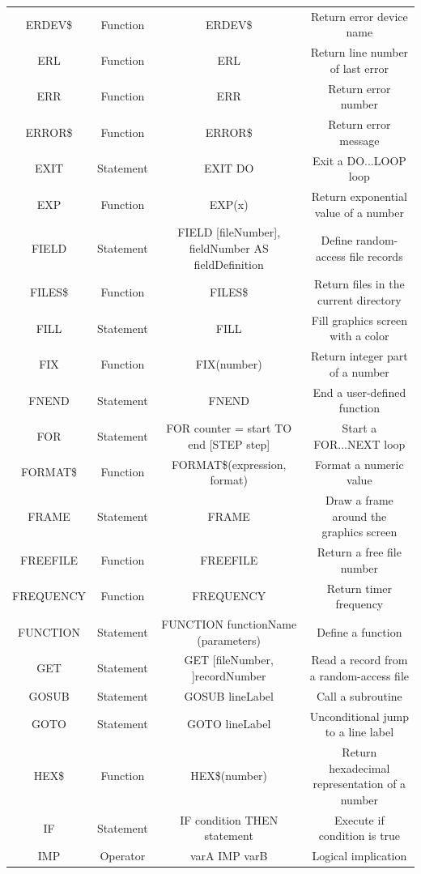 \documentclass[10pt, reqno]{exam}
\begin{document}
{\begin{longtable}{|c|c|c|c|}
    ERDEV\$ & Function & ERDEV\$ & Return error device name \\
    ERL & Function & ERL & Return line number of last error \\
    ERR & Function & ERR & Return error number \\
    ERROR\$ & Function & ERROR\$ & Return error message \\
    EXIT & Statement & EXIT DO & Exit a DO...LOOP loop \\
    EXP & Function & EXP(x) & Return exponential value of a number \\
    FIELD & Statement & FIELD [fileNumber], fieldNumber AS fieldDefinition & Define random-access file records \\
    FILES\$ & Function & FILES\$ & Return files in the current directory \\
    FILL & Statement & FILL & Fill graphics screen with a color \\
    FIX & Function & FIX(number) & Return integer part of a number \\
    FNEND & Statement & FNEND & End a user-defined function \\
    FOR & Statement & FOR counter = start TO end [STEP step] & Start a FOR...NEXT loop \\
    FORMAT\$ & Function & FORMAT\$(expression, format) & Format a numeric value \\
    FRAME & Statement & FRAME & Draw a frame around the graphics screen \\
    FREEFILE & Function & FREEFILE & Return a free file number \\
    FREQUENCY & Function & FREQUENCY & Return timer frequency \\
    FUNCTION & Statement & FUNCTION functionName (parameters) & Define a function \\
    GET & Statement & GET [fileNumber, ]recordNumber & Read a record from a random-access file \\
    GOSUB & Statement & GOSUB lineLabel & Call a subroutine \\
    GOTO & Statement & GOTO lineLabel & Unconditional jump to a line label \\
    HEX\$ & Function & HEX\$(number) & Return hexadecimal representation of a number \\
    IF & Statement & IF condition THEN statement & Execute if condition is true \\
    IMP & Operator & varA IMP varB & Logical implication \\

\end{longtable}}
\end{document}
